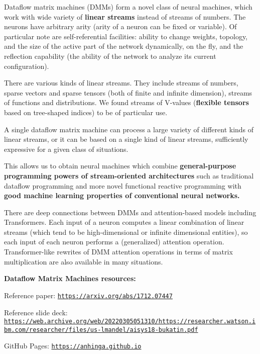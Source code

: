 \documentclass{article}
\begin{document}
Dataflow matrix machines (DMMs) form a novel class of neural machines, which work with wide variety
of {\bf linear streams} instead of streams of numbers. The neurons have
arbitrary arity (arity of a neuron can be fixed or variable). Of particular note are
self-referential facilities: ability to change weights, topology, and the size of the active part of the network dynamically, on the fly,
and the reflection capability (the ability of the network to analyze its current configuration).

There are various kinds of linear streams. They include streams of numbers, sparse vectors and sparse tensors (both of
finite and infinite dimension), streams of functions and distributions. We found streams of V-values
({\bf flexible tensors} based on tree-shaped indices) to be of particular use.

A single dataflow matrix machine can process a large variety of different kinds of linear streams, or
it can be based on a single kind of linear streams, sufficiently expressive for a given class of situations.

This allows us to obtain 
neural machines which combine {\bf general-purpose programming powers of stream-oriented
architectures} such as traditional dataflow programming and
more novel functional reactive programming with {\bf good machine learning
properties of conventional neural networks.}

There are deep connections between DMMs and attention-based models including Transformers.
Each input of a neuron computes a linear combination of linear streams (which tend to be high-dimensional
or infinite dimensional entities), so each input of each neuron performs a (generalized) attention operation.
Transformer-like rewrites of DMM attention operations in terms of matrix multiplication are also available in many situations.

\vspace{0.1in}
\noindent
{\bf Dataflow Matrix Machines resources:}

Reference paper: \href{https://arxiv.org/abs/1712.07447}{\tt https://arxiv.org/abs/1712.07447}

Reference slide deck: \href{https://web.archive.org/web/20220305051310/https://researcher.watson.ibm.com/researcher/files/us-lmandel/aisys18-bukatin.pdf}{\tiny\tt https://web.archive.org/web/20220305051310/https://researcher.watson.ibm.com/researcher/files/us-lmandel/aisys18-bukatin.pdf}

GitHub Pages: \href{https://anhinga.github.io/}{\tt https://anhinga.github.io}
\end{document}
